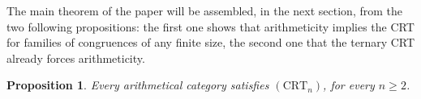 \documentclass[11pt,a4paper]{article}
\theoremstyle{plain}
\newtheorem{proposition}[theoreme]{Proposition}
\theoremstyle{definition}
\theoremstyle{remark}
\theoremstyle{plain}
\begin{document}

The main theorem of the paper will be assembled, in the next section, from
the two following propositions: the first one shows that arithmeticity implies the CRT for
families of congruences of any finite size, the second one that the ternary CRT
already forces arithmeticity.

\begin{proposition}\label{prop:arith-crt}
Every arithmetical category satisfies $(\mathrm{CRT}_n)$, for every
$n \ge 2$.
\end{proposition}
\end{document}
